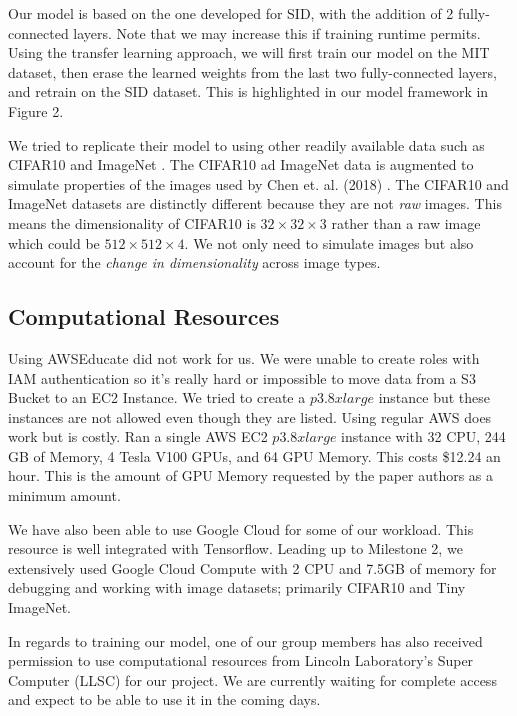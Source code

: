 \documentclass{article}
\begin{document}
Our model is based on the one developed for SID, with the addition of 2 fully-connected layers. Note that we may increase this if training runtime permits. Using the transfer learning approach, we will first train our model on the MIT dataset, then erase the learned weights from the last two fully-connected layers, and retrain on the SID dataset. This is highlighted in our model framework in Figure 2. 

We tried to replicate their model to using other readily
available data such as CIFAR10 \cite{cifar10} and ImageNet
\cite{imagenet_cvpr09}. The CIFAR10 ad ImageNet data is augmented to
simulate properties of the images used by Chen et. al. (2018)
\cite{chen2018learning}. The CIFAR10 and ImageNet datasets are distinctly
different because they are not \textit{raw} images. This means the
dimensionality of CIFAR10 is $32 \times 32 \times 3$ rather than a raw
image which could be $512 \times 512 \times 4$. We not only need to
simulate images but also account for the \textit{change in dimensionality}
across image types.



\subsection{Computational Resources}

Using AWSEducate did not work for us. We were unable to create roles with
IAM authentication so it's really hard or impossible to move data from a
S3 Bucket to an EC2 Instance. We tried to create a $p3.8xlarge$ instance but
these instances are not allowed even though they are listed. Using regular
AWS does work but is costly. Ran a single AWS EC2 $p3.8xlarge$ instance
with 32 CPU, 244 GB of Memory, 4 Tesla V100 GPUs, and 64 GPU Memory. This
costs \$12.24 an hour. This is the amount of GPU Memory requested by the
paper authors as a minimum amount. \newline

We have also been able to use Google Cloud for some of our workload. This
resource is well integrated with Tensorflow. Leading up to Milestone 2,
we extensively used Google Cloud Compute with 2 CPU and 7.5GB of memory
for debugging and working with image datasets; primarily CIFAR10 and
Tiny ImageNet. \newline

In regards to training our model, one of our group members has also
received permission to use computational resources from Lincoln
Laboratory's Super Computer (LLSC) for our project. We are currently
waiting for complete access and expect to be able to use it in the coming
days.
\end{document}
